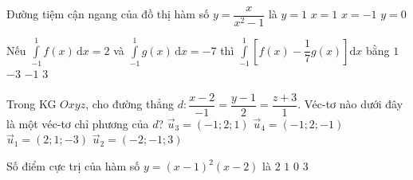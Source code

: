 \begin{ex}%
	Đường tiệm cận ngang của đồ thị hàm số $y=\dfrac{x}{x^2-1}$ là
	\choice
	{$y=1$}
	{$x=1$}
	{$x=-1$}
	{\True $y=0$}
\end{ex}

\begin{ex}%
	Nếu $\displaystyle\int\limits_{-1}^1f(x)\mathrm{\,d}x=2$ và $\displaystyle\int\limits_{-1}^1g(x)\mathrm{\,d}x=-7$ thì $\displaystyle\int\limits_{-1}^1\left[f(x)-\dfrac{1}{7}g(x)\right]\mathrm{d}x$ bằng
	\choice
	{$1$}
	{$-3$}
	{$-1$}
	{\True $3$}
\end{ex}

\begin{ex}%
	Trong KG $Oxyz$, cho đường thẳng $d\colon\dfrac{x-2}{-1}=\dfrac{y-1}{2}=\dfrac{z+3}{1}$. Véc-tơ nào dưới đây là một véc-tơ chỉ phương của $d$?
	\choice
	{\True $\overrightarrow{u}_3=\left(-1;2;1\right)$}
	{$\overrightarrow{u}_4=\left(-1;2;-1\right)$}
	{$\overrightarrow{u}_1=\left(2;1;-3\right)$}
	{$\overrightarrow{u}_2=\left(-2;-1;3\right)$}
\end{ex}

\begin{ex}%
	Số điểm cực trị của hàm số $y=(x-1)^2 (x-2)$ là
	\choice
	{\True $2$}
	{$1$}
	{$0$}
	{$3$}
\end{ex}

